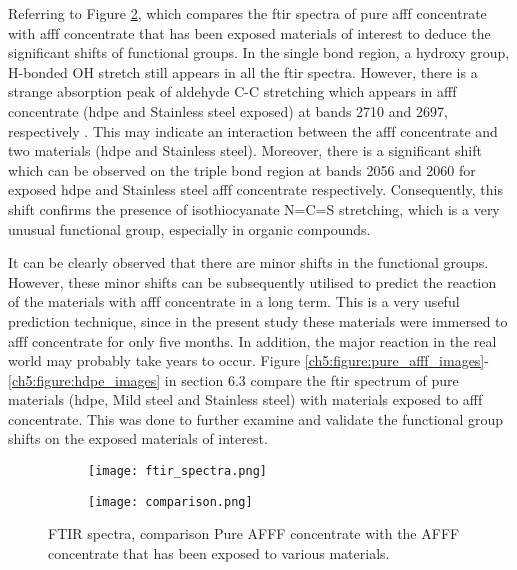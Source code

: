 Referring to Figure \ref{ch5:figure:spectra:b}, which compares the \acrshort{ftir} spectra of pure \acrshort{afff} concentrate with \acrshort{afff} concentrate that has been exposed materials of interest to deduce the significant shifts of functional groups. In the single bond region, a hydroxy group, H-bonded OH stretch still appears in all the \acrshort{ftir} spectra. However, there is a strange absorption peak of aldehyde C-C stretching which appears in \acrshort{afff} concentrate (\acrshort{hdpe} and Stainless steel exposed) at bands 2710  and 2697, respectively \cite{lin1991handbook}. This may indicate an interaction between the \acrshort{afff} concentrate and two materials (\acrshort{hdpe} and Stainless steel). Moreover, there is a significant shift which can be observed on the triple bond region at bands 2056 and 2060 for exposed \acrshort{hdpe} and Stainless steel \acrshort{afff} concentrate respectively. Consequently, this shift confirms the presence of isothiocyanate N=C=S stretching, which is a very unusual functional group, especially in organic compounds.

It can be clearly observed that there are minor shifts in the functional groups. However, these minor shifts can be subsequently utilised to predict the reaction of the materials with \acrshort{afff} concentrate in a long term. This is a very useful prediction technique, since in the present study these materials were immersed to \acrshort{afff} concentrate for only five months. In addition, the major reaction in the real world may probably take years to occur. Figure \ref{ch5:figure:pure_afff_images}-\ref{ch5:figure:hdpe_images} in section 6.3 compare the \acrshort{ftir} spectrum of pure materials (\acrshort{hdpe}, Mild steel and Stainless steel) with materials exposed to \acrshort{afff} concentrate. This was done to further examine and validate the functional group shifts on the exposed materials of interest.  

\begin{figure}[H]
\centering

\begin{subfigure}{.45\textwidth}
    \texttt{[image: ftir\_spectra.png]}
    \caption{}
    \label{ch5:figure:spectra:a}
\end{subfigure}
\begin{subfigure}{.45\textwidth}
    \texttt{[image: comparison.png]}
    \caption{}
    \label{ch5:figure:spectra:b}
\end{subfigure}

\caption{FTIR spectra, comparison Pure AFFF concentrate with the AFFF concentrate that has been exposed to various materials.}
\label{ch5:figure:spectra}
\end{figure}

